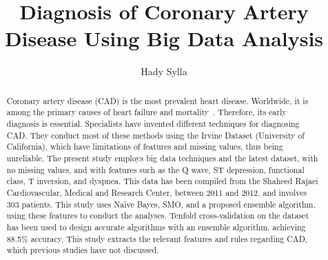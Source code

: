 
\def\paperstatus{100} %
\def\paperchapter{Application} %
\def\hid{hid-sp18-606} %
\def\volume{9} %

\def\locator{\hid, Volume: \volume, Chapter: \paperchapter, Status: \paperstatus. \newline}


\title{Diagnosis of Coronary Artery Disease Using Big Data Analysis}

\author{Hady Sylla}



\begin{abstract}
  Coronary artery disease (CAD) is the most prevalent heart disease.
  Worldwide, it is among the primary causes of heart failure and
  mortality~\cite{ali}. Therefore, its early diagnosis is essential.
  Specialists have invented different techniques for diagnosing CAD.
  They conduct most of these methods using the Irvine Dataset
  (University of California), which have limitations of features and
  missing values, thus being unreliable. The present study employs big
  data techniques and the latest dataset, with no missing values, and
  with features such as the Q wave, ST depression, functional class, T
  inversion, and dyspnea. This data has been compiled from the Shaheed
  Rajaei Cardiovascular, Medical and Research Center, between 2011 and
  2012, and involves 303 patients. This study uses Naïve Bayes, SMO,
  and a proposed ensemble algorithm, using these features to conduct
  the analyses. Tenfold cross-validation on the dataset has been used
  to design accurate algorithms with an ensemble algorithm, achieving
  88.5\% accuracy. This study extracts the relevant features and rules
  regarding CAD, which previous studies have not discussed.

\end{abstract}

